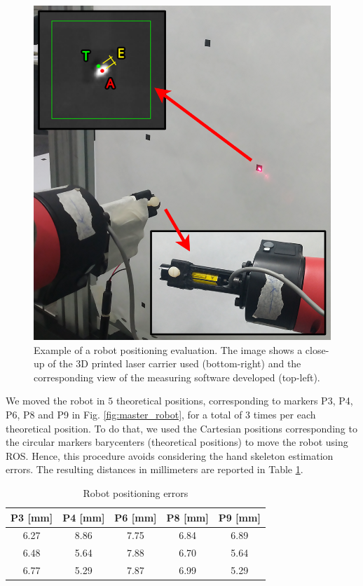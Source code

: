 \documentclass[letterpaper, 10 pt, conference]{ieeeconf}  %
\begin{document}
\begin{figure} [h!]
  \centering
  \includegraphics[width=0.7\columnwidth]{figures/lasermount.png}
  \caption{Example of a robot positioning evaluation. The image shows a close-up of the 3D printed laser carrier used (bottom-right) and the corresponding view of the measuring software developed (top-left).}
  \label{fig:laser}
\end{figure}

We moved the robot in $5$ theoretical positions, corresponding to markers P3, P4, P6, P8 and P9 in Fig. \ref{fig:master_robot}, for a total of $3$ times per each theoretical position. To do that, we used the Cartesian positions corresponding to the circular markers barycenters (theoretical positions) to move the robot using ROS. Hence, this procedure avoids considering the hand skeleton estimation errors.
The resulting distances in millimeters are reported in Table \ref{tab:laser}.

\begin{table}[h]
\begin{center}
\caption{Robot positioning errors}
\label{tab:laser}
\begin{tabular}{|c||c||c||c||c|}
\hline
\textbf{P3 [mm]} & \textbf{P4 [mm]} & \textbf{P6 [mm]} & \textbf{P8 [mm]} & \textbf{P9 [mm]} \\
\hline
6.27 & 8.86 &  7.75 & 6.84 & 6.89\\
6.48 & 5.64 & 7.88 & 6.70 & 5.64\\
6.77 & 5.29 & 7.87 & 6.99 & 5.29\\
\hline
\end{tabular}
\end{center}
\end{table}
\end{document}
